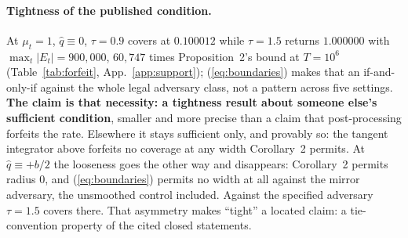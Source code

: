 \paragraph{Tightness of the published condition.} At $\mu_t = 1$,
$\hat{q} \equiv 0$, $\tau = 0.9$ covers at $0.100012$ while $\tau = 1.5$ returns $1.000000$ with
$\max_t|E_t| = 900{,}000$, $60{,}747$ times Proposition~2's bound at $T = 10^6$
(Table~\ref{tab:forfeit}, App.~\ref{app:support}); (\ref{eq:boundaries}) makes that an
if-and-only-if against the whole legal adversary class, not a pattern across five settings. \textbf{The claim is that necessity: a
tightness result about someone else's sufficient condition}, smaller and more precise than a
claim that post-processing forfeits the rate. Elsewhere it stays sufficient only, and provably so:
the tangent integrator above forfeits no coverage at any width Corollary~2 permits. At $\hat{q}
\equiv +b/2$ the looseness goes the other way and disappears: Corollary~2 permits radius $0$, and
(\ref{eq:boundaries}) permits no width at all against the mirror adversary, the unsmoothed control
included. Against the specified adversary $\tau = 1.5$ covers there. That asymmetry
makes ``tight'' a located claim: a tie-convention property of the cited closed statements.

